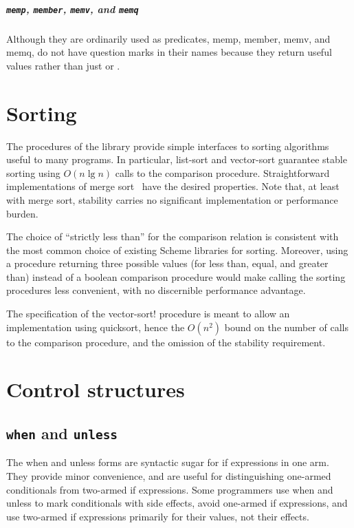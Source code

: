 \documentclass[twoside,twocolumn]{algol60}
\begin{document}
\paragraph{{\tt memp}, {\tt member}, {\tt memv}, and {\tt memq}}

Although they are ordinarily used as predicates, {\cf memp}, {\cf
  member}, {\cf memv}, and {\cf memq}, do not have question marks in
their names because they return useful values rather than just
\schtrue{} or \schfalse{}.

\chapter{Sorting}

The procedures of the  library provide simple
interfaces to sorting algorithms useful to many programs.  In
particular, {\cf list-sort} and {\cf vector-sort} guarantee stable
sorting using $O(n \lg n)$ calls to the comparison procedure.
Straightforward implementations of merge sort~\cite{algorithms} have
the desired properties.  Note that, at least with merge sort,
stability carries no significant implementation or performance burden.

The choice of ``strictly less than'' for the comparison relation is
consistent with the most common choice of existing Scheme libraries
for sorting.  Moreover, using a procedure returning three possible
values (for less than, equal, and greater than) instead of a boolean
comparison procedure would make calling the sorting procedures less
convenient, with no discernible performance advantage.

The specification of the {\cf vector-sort!} procedure is meant to
allow an implementation using quicksort, hence the $O(n^2)$
bound on the number of calls to the comparison procedure, and the
omission of the stability requirement.

\chapter{Control structures}

\section{{\tt when} and {\tt unless}}

The {\cf when} and {\cf unless} forms are syntactic sugar for {\cf if}
expressions in one arm.  They provide minor convenience, and are
useful for distinguishing one-armed conditionals from two-armed {\cf
  if} expressions.  Some programmers use {\cf when} and {\cf unless}
to mark conditionals with side effects, avoid one-armed {\cf if}
expressions, and use two-armed {\cf if} expressions primarily for
their values, not their effects.
\end{document}

